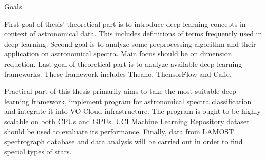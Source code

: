 \chap Goals

First goal of thesis' theoretical part is to introduce deep learning concepts
in context of astronomical data. This includes definitions of terms frequently
used in deep learning.  
Second goal is to analyze some preprocessing algorithm and their application
on astronomical spectra. Main focus should be on dimension reduction.  
Last goal of theoretical part is to analyze available deep learning frameworks.
These framework includes Theano, ThensorFlow and Caffe.

Practical part of this thesis primarily aims to take the most suitable deep
learning framework, implement program for astronomical spectra
classification and integrate it into VO Cloud infrastructure.  
The program is ought to be highly scalable on both CPUs and GPUs. UCI Machine
Learning Repository dataset should be used to evaluate its performance.  
Finally, data from LAMOST spectrograph database and data analysis will be
carried out in order to find special types of stars.
